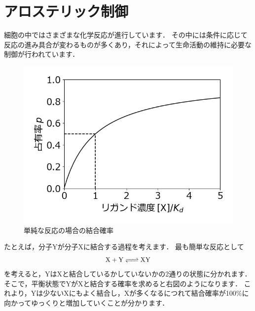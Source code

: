 \documentclass[12pt, a4j, dvipdfmx, sffamily]{jsarticle}
\begin{document}
\sffamily\gtfamily
\newpage
\section*{アロステリック制御}
\begin{tcbraster}[raster columns = 1]
	\begin{tcolorbox}[title = 生物と化学反応]
	細胞の中ではさまざまな化学反応が進行しています．
	その中には条件に応じて反応の進み具合が変わるものが多くあり，それによって生命活動の維持に必要な制御が行われています．
	\end{tcolorbox}
 \begin{tcolorbox}[title = 単純な化学反応 , height = 63mm]
	\begin{figure}
	 \centering
	 \includegraphics[width=\linewidth]{simple_poster.png}
	 \caption{単純な反応の場合の結合確率}
	\end{figure}
	たとえば，分子Yが分子Xに結合する過程を考えます．
  最も簡単な反応として
  \begin{equation*}
	 \ce{X + Y <=> XY}
  \end{equation*}
  を考えると，YはXと結合しているかしていないかの2通りの状態に分かれます．
	そこで，平衡状態でYがXと結合する確率を求めると右図のようになります．
	これより，Yは少ないXにもよく結合し，Xが多くなるにつれて結合確率が100\%に向かってゆっくりと増加していくことが分かります．	
　\end{tcolorbox}


\end{tcbraster}
\end{document}
